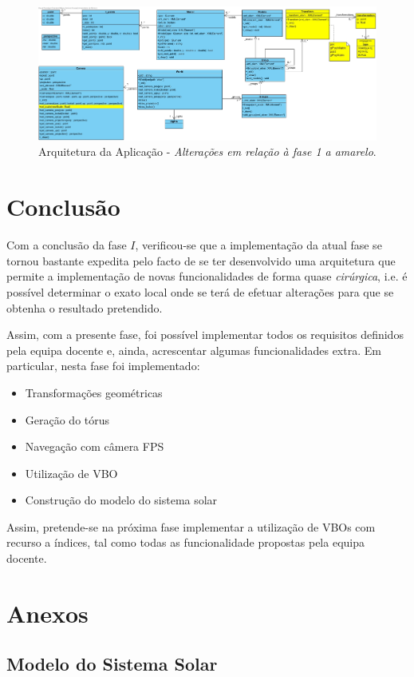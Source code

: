 \documentclass[runningheads]{llncs}
\newenvironment{code}{\captionsetup{type=listing}}{}
\begin{document}
\begin{landscape}
    \begin{figure}
        \centering
        \includegraphics[width=\linewidth]{assets/world.jpg}
        \caption{Arquitetura da Aplicação - \textit{Alterações em relação à fase 1 a amarelo}.}
    \end{figure}
\end{landscape}

\section{Conclusão}
Com a conclusão da fase $I$, verificou-se que a implementação da atual fase 
se tornou bastante expedita pelo facto de se ter desenvolvido
uma arquitetura que permite a implementação de novas funcionalidades 
de forma quase \textit{cirúrgica}, i.e. é possível determinar o exato 
local onde se terá de efetuar alterações para que se obtenha o resultado
pretendido.

Assim, com a presente fase, foi possível implementar todos os requisitos 
definidos pela equipa docente e, ainda, acrescentar algumas funcionalidades extra.
Em particular, nesta fase foi implementado:
\begin{itemize}
    \item Transformações geométricas
    \item Geração do tórus
    \item Navegação com câmera FPS
    \item Utilização de VBO
    \item Construção do modelo do sistema solar
\end{itemize}

Assim, pretende-se na próxima fase implementar a utilização de VBOs 
com recurso a índices, tal como todas as funcionalidade propostas pela
equipa docente.

\section*{Anexos}
\subsection*{Modelo do Sistema Solar}
\begin{code}
\label{code:sistema_solar_xml}
\inputminted[linenos, breaklines, frame=lines]{xml}{../../demos/solar_system.xml}
\end{code}


%
%
%
% 
% 
%
\end{document}
